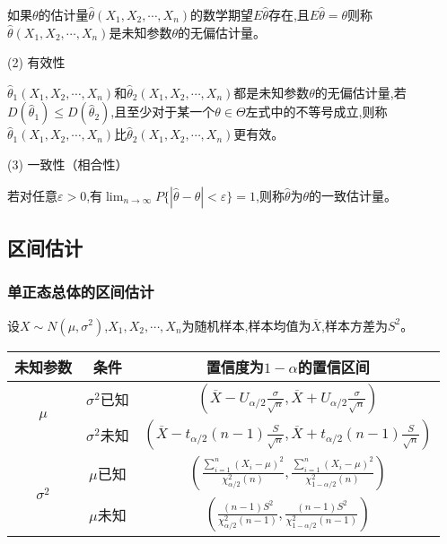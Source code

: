 \documentclass[UTF8]{ctexart}
\theoremstyle{remark}
\begin{document}
		如果\(\theta\)的估计量\(\hat{\theta}(X_1,X_2,\cdots,X_n)\)的数学期望\(E\hat{\theta}\)存在,且\(E\hat{\theta}=\theta\)则称\(\hat{\theta}(X_1,X_2,\cdots,X_n)\)是未知参数\(\theta\)的无偏估计量。
		
		(2) 有效性
		
		\(\hat{\theta}_1(X_1,X_2,\cdots,X_n)\)和\(\hat{\theta}_2(X_1,X_2,\cdots,X_n)\)都是未知参数\(\theta\)的无偏估计量,若\(D(\hat{\theta}_1)\leq D(\hat{\theta}_2)\),且至少对于某一个\(\theta\in\Theta\)左式中的不等号成立,则称\(\hat{\theta}_1(X_1,X_2,\cdots,X_n)\)比\(\hat{\theta}_2(X_1,X_2,\cdots,X_n)\)更有效。
		
		(3) 一致性（相合性）
		
		若对任意\(\varepsilon>0\),有\(\lim_{n \to \infty} P\{|\hat{\theta}-\theta|<\varepsilon\}=1\),则称\(\hat{\theta}\)为\(\theta\)的一致估计量。
		
		\subsection{区间估计}
		\subsubsection{单正态总体的区间估计}
		设\(X \sim N(\mu,\sigma^{2})\),\(X_1, X_2, \cdots, X_n\)为随机样本,样本均值为\(\overline{X}\),样本方差为\(S^{2}\)。
		
		\begin{table}[H]
			\centering
			\begin{tabular}{ccc}
				\toprule
				未知参数 & 条件 & 置信度为\(1 - \alpha\)的置信区间 \\
				\midrule
				\multirow{2}{*}{\(\mu\)} 
				& \(\sigma^{2}\)已知 & \((\overline{X}-U_{\alpha/2}\frac{\sigma}{\sqrt{n}},\overline{X}+U_{\alpha/2}\frac{\sigma}{\sqrt{n}})\) \\
				& \(\sigma^{2}\)未知 & \((\overline{X}-t_{\alpha/2}(n - 1)\frac{S}{\sqrt{n}},\overline{X}+t_{\alpha/2}(n - 1)\frac{S}{\sqrt{n}})\) \\
				\midrule
				\multirow{2}{*}{\(\sigma^{2}\)} 
				& \(\mu\)已知 & \((\frac{\sum_{i = 1}^{n}(X_i - \mu)^{2}}{\chi_{\alpha/2}^{2}(n)},\frac{\sum_{i = 1}^{n}(X_i - \mu)^{2}}{\chi_{1 - \alpha/2}^{2}(n)})\) \\
				& \(\mu\)未知 & \((\frac{(n - 1)S^{2}}{\chi_{\alpha/2}^{2}(n - 1)},\frac{(n - 1)S^{2}}{\chi_{1 - \alpha/2}^{2}(n - 1)})\) \\
				\bottomrule
			\end{tabular}
		\end{table}
		
\end{document}
